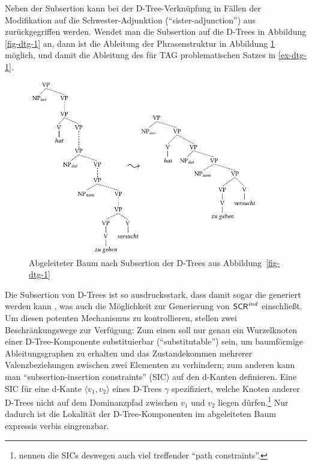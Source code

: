Neben der Subsertion kann bei der D-Tree-Verknüpfung in Fällen der Modifikation auf die Schwester-Adjunktion ("`sister-adjunction"') aus \cite{Schabes:Shieber:94} zurückgegriffen werden. Wendet man die Subsertion auf die D-Trees in Abbildung \ref{fig-dtg-1} an, dann ist die Ableitung der Phrasenstruktur in Abbildung \ref{fig-dtg-2} möglich, und damit die Ableitung des für TAG problematischen Satzes in \ref{ex-dtg-1}.
\begin{figure}[t]
\centering
\includegraphics{graphics/abb610.pdf}
\caption{\label{fig-dtg-2}Abgeleiteter Baum nach Subsertion der D-Trees aus Abbildung~\ref{fig-dtg-1}}
\end{figure}

Die Subsertion von D-Trees ist so ausdrucksstark, dass damit sogar die  generiert werden kann \citep[Abb.~13]{Rambow:etal:01}, was auch die Möglichkeit zur Generierung von $\mathsf{SCR}^{\mathit{ind}}$ einschlie\ss t. Um diesen potenten Mechanismus zu kontrollieren, stellen \cite{Rambow:etal:95} zwei Beschränkungswege zur Verfügung: Zum einen soll nur genau ein Wurzelknoten einer D-Tree-Komponente substituierbar ("`substitutable"') sein, um baumförmige Ableitungsgraphen zu erhalten und das Zustandekommen mehrerer Valenzbeziehungen zwischen zwei Elementen zu verhindern; zum anderen kann man "`subsertion-insertion constraints"' (SIC) auf den d-Kanten definieren. Eine SIC für eine d-Kante $\langle v_1,v_2 \rangle$ eines D-Trees $\gamma$ spezifiziert, welche Knoten anderer D-Trees nicht auf dem Dominanzpfad zwischen $v_1$ und $v_2$ liegen dürfen.\footnote{\cite{Rambow:etal:01} nennen die SICs deswegen auch viel treffender "`path constraints"'.} Nur dadurch ist die Lokalität der D-Tree-Komponenten im abgeleiteten Baum expressis verbis eingrenzbar.

